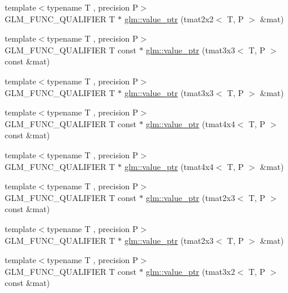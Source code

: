\begin{DoxyCompactItemize}
\item 
{\footnotesize template$<$typename T , precision P$>$ }\\G\+L\+M\+\_\+\+F\+U\+N\+C\+\_\+\+Q\+U\+A\+L\+I\+F\+I\+E\+R T $\ast$ \hyperlink{group__gtc__type__ptr_gac7256e14328e818e61276fa5e6176b9d}{glm\+::value\+\_\+ptr} (tmat2x2$<$ T, P $>$ \&mat)
\item 
{\footnotesize template$<$typename T , precision P$>$ }\\G\+L\+M\+\_\+\+F\+U\+N\+C\+\_\+\+Q\+U\+A\+L\+I\+F\+I\+E\+R T const $\ast$ \hyperlink{group__gtc__type__ptr_ga0fd20ac385befba86cf2bbf836728bc2}{glm\+::value\+\_\+ptr} (tmat3x3$<$ T, P $>$ const \&mat)
\item 
{\footnotesize template$<$typename T , precision P$>$ }\\G\+L\+M\+\_\+\+F\+U\+N\+C\+\_\+\+Q\+U\+A\+L\+I\+F\+I\+E\+R T $\ast$ \hyperlink{group__gtc__type__ptr_ga4470e16d0e844cb2c4f7b2e731824f87}{glm\+::value\+\_\+ptr} (tmat3x3$<$ T, P $>$ \&mat)
\item 
{\footnotesize template$<$typename T , precision P$>$ }\\G\+L\+M\+\_\+\+F\+U\+N\+C\+\_\+\+Q\+U\+A\+L\+I\+F\+I\+E\+R T const $\ast$ \hyperlink{group__gtc__type__ptr_ga2edadf5433694bf018d62db962b61321}{glm\+::value\+\_\+ptr} (tmat4x4$<$ T, P $>$ const \&mat)
\item 
{\footnotesize template$<$typename T , precision P$>$ }\\G\+L\+M\+\_\+\+F\+U\+N\+C\+\_\+\+Q\+U\+A\+L\+I\+F\+I\+E\+R T $\ast$ \hyperlink{group__gtc__type__ptr_ga1fc49ab60e5afdd4821a6903e92244a4}{glm\+::value\+\_\+ptr} (tmat4x4$<$ T, P $>$ \&mat)
\item 
{\footnotesize template$<$typename T , precision P$>$ }\\G\+L\+M\+\_\+\+F\+U\+N\+C\+\_\+\+Q\+U\+A\+L\+I\+F\+I\+E\+R T const $\ast$ \hyperlink{group__gtc__type__ptr_ga968f2c8899914ea1c1daaaded8daa6b5}{glm\+::value\+\_\+ptr} (tmat2x3$<$ T, P $>$ const \&mat)
\item 
{\footnotesize template$<$typename T , precision P$>$ }\\G\+L\+M\+\_\+\+F\+U\+N\+C\+\_\+\+Q\+U\+A\+L\+I\+F\+I\+E\+R T $\ast$ \hyperlink{group__gtc__type__ptr_ga36fb9a17664c8b6848a5d005e4068a2f}{glm\+::value\+\_\+ptr} (tmat2x3$<$ T, P $>$ \&mat)
\item 
{\footnotesize template$<$typename T , precision P$>$ }\\G\+L\+M\+\_\+\+F\+U\+N\+C\+\_\+\+Q\+U\+A\+L\+I\+F\+I\+E\+R T const $\ast$ \hyperlink{group__gtc__type__ptr_ga398202d6ce304deb7da50badde85ee41}{glm\+::value\+\_\+ptr} (tmat3x2$<$ T, P $>$ const \&mat)

\end{DoxyCompactItemize}
